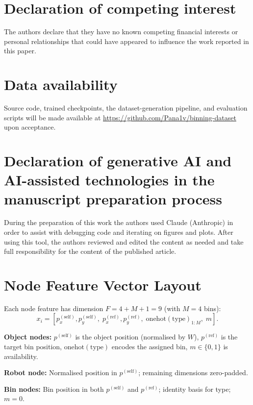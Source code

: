 \documentclass[review,times]{elsarticle}
\begin{document}
\section*{Declaration of competing interest}
The authors declare that they have no known competing financial interests or personal relationships that could have appeared to influence the work reported in this paper.

\section*{Data availability}
Source code, trained checkpoints, the dataset-generation pipeline, and evaluation scripts will be made available at \url{https://github.com/Pana1v/binning-dataset} upon acceptance.

\section*{Declaration of generative AI and AI-assisted technologies in the manuscript preparation process}
During the preparation of this work the authors used Claude (Anthropic) in order to assist with debugging code and iterating on figures and plots. After using this tool, the authors reviewed and edited the content as needed and take full responsibility for the content of the published article.

\appendix
\section{Node Feature Vector Layout}\label{app:features}

Each node feature has dimension $F = 4 + M + 1 = 9$ (with $M{=}4$ bins):
\begin{equation}
x_i = [p^{(\text{self})}_x, p^{(\text{self})}_y,\; p^{(\text{ref})}_x, p^{(\text{ref})}_y,\; \text{onehot}(\text{type})_{1:M},\; m].
\end{equation}

\textbf{Object nodes:} $p^{(\text{self})}$ is the object position (normalised by $W$), $p^{(\text{ref})}$ is the target bin position, $\text{onehot}(\text{type})$ encodes the assigned bin, $m \in \{0,1\}$ is availability.

\textbf{Robot node:} Normalised position in $p^{(\text{self})}$; remaining dimensions zero-padded.

\textbf{Bin nodes:} Bin position in both $p^{(\text{self})}$ and $p^{(\text{ref})}$; identity basis for type; $m{=}0$.



\end{document}
